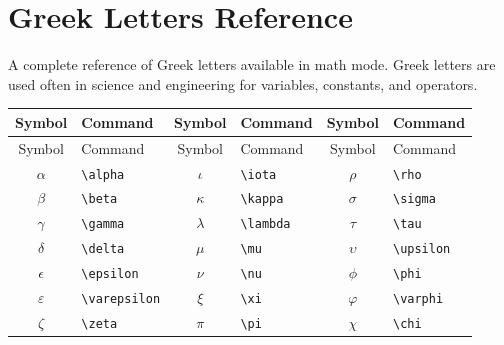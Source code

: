 \clearpage
\section{Greek Letters Reference}
A complete reference of Greek letters available in math mode. Greek letters are used often in science and engineering for variables, constants, and operators.

\begin{tabularx}{\linewidth}{@{}clclcl@{}}
	\caption{Lowercase Greek letters.}
	\label{tab:greek-lower} \\
	\toprule
	Symbol & Command & Symbol & Command & Symbol & Command \\
	\midrule
	\endfirsthead
	\toprule
	Symbol & Command & Symbol & Command & Symbol & Command \\
	\midrule
	\endhead
	\bottomrule
	\endfoot
	\bottomrule
	\endlastfoot
	$\alpha$      & \texttt{\textbackslash alpha}      & $\iota$      & \texttt{\textbackslash iota}       & $\rho$       & \texttt{\textbackslash rho}        \\
	
	$\beta$       & \texttt{\textbackslash beta}       & $\kappa$     & \texttt{\textbackslash kappa}      & $\sigma$     & \texttt{\textbackslash sigma}      \\
	
	$\gamma$      & \texttt{\textbackslash gamma}      & $\lambda$    & \texttt{\textbackslash lambda}     & $\tau$       & \texttt{\textbackslash tau}        \\
	
	$\delta$      & \texttt{\textbackslash delta}      & $\mu$        & \texttt{\textbackslash mu}         & $\upsilon$   & \texttt{\textbackslash upsilon}    \\
	
	$\epsilon$    & \texttt{\textbackslash epsilon}    & $\nu$        & \texttt{\textbackslash nu}         & $\phi$       & \texttt{\textbackslash phi}        \\
	
	$\varepsilon$ & \texttt{\textbackslash varepsilon} & $\xi$        & \texttt{\textbackslash xi}         & $\varphi$    & \texttt{\textbackslash varphi}     \\
	
	$\zeta$       & \texttt{\textbackslash zeta}       & $\pi$        & \texttt{\textbackslash pi}         & $\chi$       & \texttt{\textbackslash chi}        \\
	

\end{tabularx}
